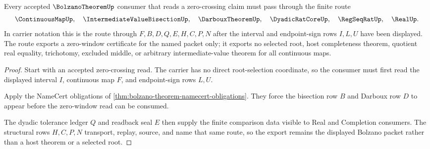 \begin{theorem}
\label{thm:bolzano-theorem-ivp-route}
Every accepted $\BolzanoTheoremUp$ consumer that reads a zero-crossing claim must pass through the finite route
$$
\ContinuousMapUp,\quad \IntermediateValueBisectionUp,\quad \DarbouxTheoremUp,\quad \DyadicRatCoreUp,\quad \RegSeqRatUp,\quad \RealUp .
$$
In carrier notation this is the route through $F,B,D,Q,E,H,C,P,N$ after the interval and endpoint-sign rows $I,L,U$ have been displayed. The route exports a zero-window certificate for the named packet only; it exports no selected root, host completeness theorem, quotient real equality, trichotomy, excluded middle, or arbitrary intermediate-value theorem for all continuous maps.
\end{theorem}
\begin{proof}
Start with an accepted zero-crossing read. The carrier has no direct root-selection coordinate, so the consumer must first read the displayed interval $I$, continuous map $F$, and endpoint-sign rows $L,U$.

Apply the NameCert obligations of \autoref{thm:bolzano-theorem-namecert-obligations}. They force the bisection row $B$ and Darboux row $D$ to appear before the zero-window read can be consumed.

The dyadic tolerance ledger $Q$ and readback seal $E$ then supply the finite comparison data visible to Real and Completion consumers. The structural rows $H,C,P,N$ transport, replay, source, and name that same route, so the export remains the displayed Bolzano packet rather than a host theorem or a selected root.
\end{proof}




